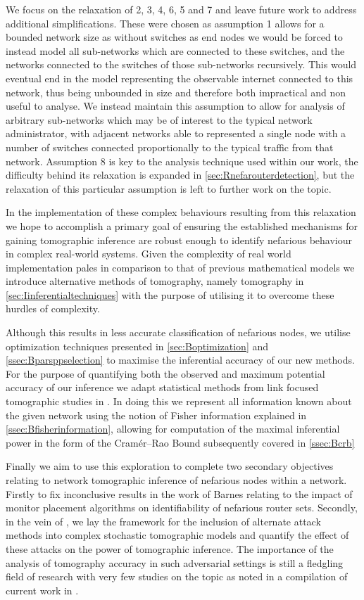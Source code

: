We focus on the relaxation of 2, 3, 4, 6, 5 and 7 and leave future work to address additional simplifications. These were chosen as assumption 1 allows for a bounded network size as without switches as end nodes we would be forced to instead model all sub-networks which are connected to these switches, and the networks connected to the switches of those sub-networks recursively. This would eventual end in the model representing the observable internet connected to this network, thus being unbounded in size and therefore both impractical and non useful to analyse. We instead maintain this assumption to allow for analysis of arbitrary sub-networks which may be of interest to the typical network administrator, with adjacent networks able to represented a single node with a number of switches connected proportionally to the typical traffic from that network. Assumption 8 is key to the analysis technique used within our work, the difficulty behind its relaxation is expanded in \cref{sec:Rnefarouterdetection}, but the relaxation of this particular assumption is left to further work on the topic.\par
In the implementation of these complex behaviours resulting from this relaxation we hope to accomplish a primary goal of ensuring the established mechanisms for gaining tomographic inference are robust enough to identify nefarious behaviour in complex real-world systems. Given the complexity of real world implementation pales in comparison to that of previous mathematical models we introduce alternative methods of tomography, namely \pdv tomography in \cref{sec:Iinferentialtechniques} with the purpose of utilising it to overcome these hurdles of complexity.\par
Although this results in less accurate classification of nefarious nodes, we utilise optimization techniques presented in \cref{sec:Boptimization} and \cref{ssec:Bparsppselection} to maximise the inferential accuracy of our new methods. For the purpose of quantifying both the observed and maximum potential accuracy of our inference we adapt statistical methods from link focused tomographic studies in \cite{he_fisher_2015}. In doing this we represent all information known about the given network using the notion of Fisher information explained in \cref{ssec:Bfisherinformation}, allowing for computation of the maximal inferential power in the form of the Cramér–Rao Bound subsequently covered in \cref{ssec:Bcrb}\par
Finally we aim to use this exploration to complete two secondary objectives relating to network tomographic inference of nefarious nodes within a network. Firstly to fix inconclusive results in the work of Barnes relating to the impact of monitor placement algorithms on identifiability of nefarious router sets. Secondly, in the vein of \cite{zhao_measurement_2020}, we lay the framework for the inclusion of alternate attack methods into complex stochastic tomographic models and quantify the effect of these attacks on the power of tomographic inference. The importance of the analysis of tomography accuracy in such adversarial settings is still a fledgling field of research with very few studies on the topic as noted in a compilation of current work in \cite{he_network_2021}.

